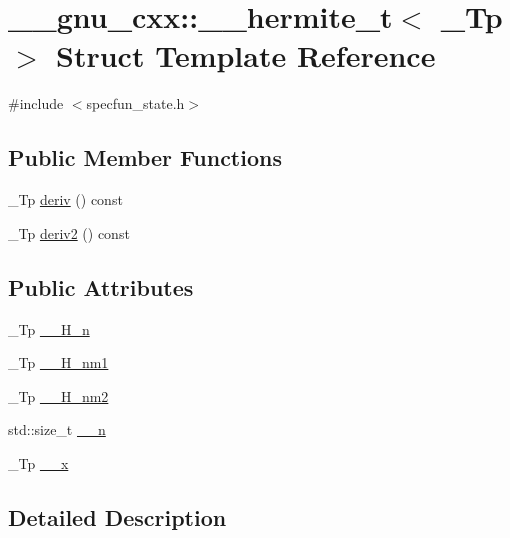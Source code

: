 \hypertarget{struct____gnu__cxx_1_1____hermite__t}{}\section{\+\_\+\+\_\+gnu\+\_\+cxx\+:\+:\+\_\+\+\_\+hermite\+\_\+t$<$ \+\_\+\+Tp $>$ Struct Template Reference}
\label{struct____gnu__cxx_1_1____hermite__t}


{\ttfamily \#include $<$specfun\+\_\+state.\+h$>$}

\subsection*{Public Member Functions}
\begin{DoxyCompactItemize}
\item 
\+\_\+\+Tp \hyperlink{struct____gnu__cxx_1_1____hermite__t_aa92fd4096ca98fedad08b95187bb7a34}{deriv} () const
\item 
\+\_\+\+Tp \hyperlink{struct____gnu__cxx_1_1____hermite__t_a2deb14d149cf302151ae1d318adec995}{deriv2} () const
\end{DoxyCompactItemize}
\subsection*{Public Attributes}
\begin{DoxyCompactItemize}
\item 
\+\_\+\+Tp \hyperlink{struct____gnu__cxx_1_1____hermite__t_a98a85357be4cb36000df3e552c197408}{\+\_\+\+\_\+\+H\+\_\+n}
\item 
\+\_\+\+Tp \hyperlink{struct____gnu__cxx_1_1____hermite__t_af2c7ee1e0f02c0debd4fbe2b5c59673e}{\+\_\+\+\_\+\+H\+\_\+nm1}
\item 
\+\_\+\+Tp \hyperlink{struct____gnu__cxx_1_1____hermite__t_a7b35cb679cb110703a0089c726b2a1ab}{\+\_\+\+\_\+\+H\+\_\+nm2}
\item 
std\+::size\+\_\+t \hyperlink{struct____gnu__cxx_1_1____hermite__t_a77e4819d1c23fa599d00d949f8b4f6fe}{\+\_\+\+\_\+n}
\item 
\+\_\+\+Tp \hyperlink{struct____gnu__cxx_1_1____hermite__t_a0d0d266ed927f890a51f9a5ef635a5d3}{\+\_\+\+\_\+x}
\end{DoxyCompactItemize}


\subsection{Detailed Description}
